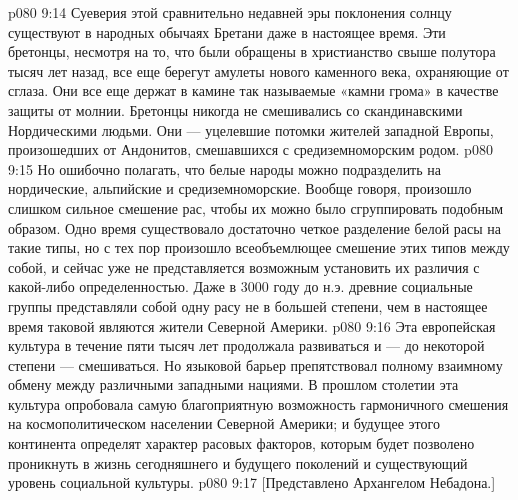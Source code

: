 \vs p080 9:14 Суеверия этой сравнительно недавней эры поклонения солнцу существуют в народных обычаях Бретани даже в настоящее время. Эти бретонцы, несмотря на то, что были обращены в христианство свыше полутора тысяч лет назад, все еще берегут амулеты нового каменного века, охраняющие от сглаза. Они все еще держат в камине так называемые «камни грома» в качестве защиты от молнии. Бретонцы никогда не смешивались со скандинавскими Нордическими людьми. Они --- уцелевшие потомки жителей западной Европы, произошедших от Андонитов, смешавшихся с средиземноморским родом.
\vs p080 9:15 \pc Но ошибочно полагать, что белые народы можно подразделить на нордические, альпийские и средиземноморские. Вообще говоря, произошло слишком сильное смешение рас, чтобы их можно было сгруппировать подобным образом. Одно время существовало достаточно четкое разделение белой расы на такие типы, но с тех пор произошло всеобъемлющее смешение этих типов между собой, и сейчас уже не представляется возможным установить их различия с какой\hyp{}либо определенностью. Даже в 3000 году до н.э. древние социальные группы представляли собой одну расу не в большей степени, чем в настоящее время таковой являются жители Северной Америки.
\vs p080 9:16 Эта европейская культура в течение пяти тысяч лет продолжала развиваться и --- до некоторой степени --- смешиваться. Но языковой барьер препятствовал полному взаимному обмену между различными западными нациями. В прошлом столетии эта культура опробовала самую благоприятную возможность гармоничного смешения на космополитическом населении Северной Америки; и будущее этого континента определят характер расовых факторов, которым будет позволено проникнуть в жизнь сегодняшнего и будущего поколений и существующий уровень социальной культуры.
\vsetoff
\vs p080 9:17 [Представлено Архангелом Небадона.]
